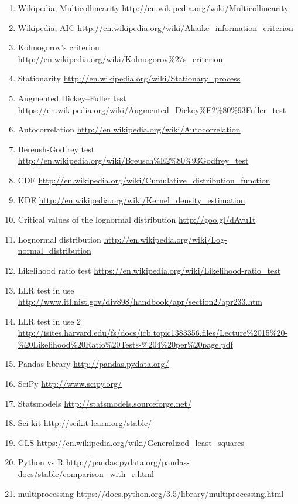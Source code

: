 \documentclass{article}
\begin{document}
\begin{enumerate}
	\item Wikipedia, Multicollinearity \url{http://en.wikipedia.org/wiki/Multicollinearity}
	\item Wikipedia, AIC \url{http://en.wikipedia.org/wiki/Akaike_information_criterion}
	\item Kolmogorov's criterion \url{http://en.wikipedia.org/wiki/Kolmogorov\%27s_criterion}
	\item Stationarity \url{http://en.wikipedia.org/wiki/Stationary_process}
	\item Augmented Dickey–Fuller test \url{https://en.wikipedia.org/wiki/Augmented_Dickey\%E2\%80\%93Fuller_test}
	\item Autocorrelation \url{http://en.wikipedia.org/wiki/Autocorrelation}
	\item Bereush-Godfrey test \url{http://en.wikipedia.org/wiki/Breusch\%E2\%80\%93Godfrey_test}
	\item CDF \url{http://en.wikipedia.org/wiki/Cumulative_distribution_function}
	\item KDE \url{http://en.wikipedia.org/wiki/Kernel_density_estimation}
	\item Critical values of the lognormal distribution \url{http://goo.gl/dAvu1t}
	\item Lognormal distribution \url{http://en.wikipedia.org/wiki/Log-normal_distribution}
	\item Likelihood ratio test \url{https://en.wikipedia.org/wiki/Likelihood-ratio_test}
	\item LLR test in use  \url{http://www.itl.nist.gov/div898/handbook/apr/section2/apr233.htm}

    \item LLR test in use 2  \url{http://isites.harvard.edu/fs/docs/icb.topic1383356.files/Lecture%2015%20-%20Likelihood%20Ratio%20Tests-%204%20per%20page.pdf}
    \item Pandas library \url{http://pandas.pydata.org/}
    \item SciPy \url{http://www.scipy.org/}
    \item Statsmodels \url{http://statsmodels.sourceforge.net/}
    \item Sci-kit \url{http://scikit-learn.org/stable/}
    \item GLS \url{https://en.wikipedia.org/wiki/Generalized_least_squares}
    \item Python vs R \url{http://pandas.pydata.org/pandas-docs/stable/comparison_with_r.html}
    \item multiprocessing \url{https://docs.python.org/3.5/library/multiprocessing.html}
\end{enumerate}

\newpage
\end{document}

